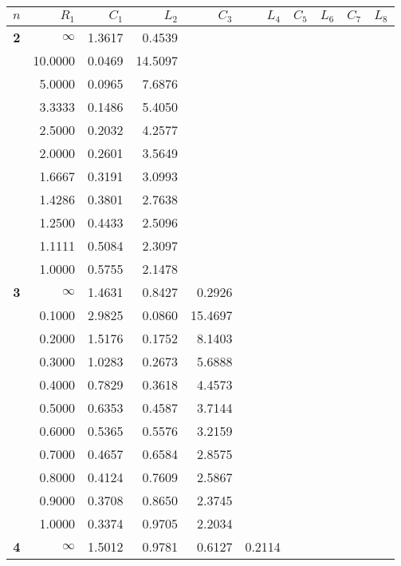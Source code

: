 \begin{table}[!htb]
\begin{center}
{\tiny
\begin{tabular}{|c||r|r|r|r|r|r|r|r|r|}\hline
$n$ & $R_1$   & $C_1$ & $L_2$ & $C_3$ & $L_4$ & $C_5$ & $L_6$ & $C_7$ & $L_8$\\ \hline\hline
\textbf{ 2}&$\infty$&1.3617&0.4539&     &     &     &     &     &     \\
&10.0000&0.0469&14.5097&     &     &     &     &     &     \\
&5.0000&0.0965&7.6876&     &     &     &     &     &     \\
&3.3333&0.1486&5.4050&     &     &     &     &     &     \\
&2.5000&0.2032&4.2577&     &     &     &     &     &     \\
&2.0000&0.2601&3.5649&     &     &     &     &     &     \\
&1.6667&0.3191&3.0993&     &     &     &     &     &     \\
&1.4286&0.3801&2.7638&     &     &     &     &     &     \\
&1.2500&0.4433&2.5096&     &     &     &     &     &     \\
&1.1111&0.5084&2.3097&     &     &     &     &     &     \\
&1.0000&0.5755&2.1478&     &     &     &     &     &     \\ \hline
\textbf{ 3}&$\infty$&1.4631&0.8427&0.2926&     &     &     &     &     \\
&0.1000&2.9825&0.0860&15.4697&     &     &     &     &     \\
&0.2000&1.5176&0.1752&8.1403&     &     &     &     &     \\
&0.3000&1.0283&0.2673&5.6888&     &     &     &     &     \\
&0.4000&0.7829&0.3618&4.4573&     &     &     &     &     \\
&0.5000&0.6353&0.4587&3.7144&     &     &     &     &     \\
&0.6000&0.5365&0.5576&3.2159&     &     &     &     &     \\
&0.7000&0.4657&0.6584&2.8575&     &     &     &     &     \\
&0.8000&0.4124&0.7609&2.5867&     &     &     &     &     \\
&0.9000&0.3708&0.8650&2.3745&     &     &     &     &     \\
&1.0000&0.3374&0.9705&2.2034&     &     &     &     &     \\ \hline
\textbf{ 4}&$\infty$&1.5012&0.9781&0.6127&0.2114&     &     &     &     \\

\end{tabular}}
\end{center}
\end{table}

